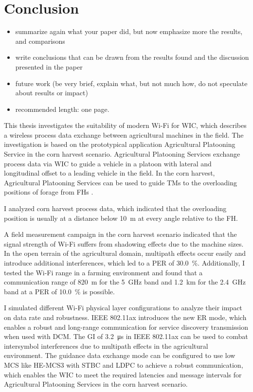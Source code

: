 \chapter{Conclusion}
\acresetall

\begin{itemize}
\item summarize again what your paper did, but now emphasize more the results, and comparisons
\item write conclusions that can be drawn from the results found and the discussion presented in the paper
\item future work (be very brief, explain what, but not much how, do not speculate about results or impact)
\item recommended length: one page.
\end{itemize}
This thesis investigates the suitability of modern Wi-Fi for \ac{WIC}, which describes a wireless process data exchange between agricultural machines in the field.
The investigation is based on the prototypical application Agricultural Platooning Service in the corn harvest scenario.
Agricultural Platooning Services exchange process data via \ac{WIC} to guide a vehicle in a platoon with lateral and longitudinal
offset to a leading vehicle in the field.
In the corn harvest, Agricultural Platooning Services can be used to guide \ac{TM}s to the overloading positions of forage from \ac{FH}s .

I analyzed corn harvest process data, which indicated that the overloading position is usually at a distance below \SI{10}{\metre} at every angle relative to the \ac{FH}.

A field measurement campaign in the corn harvest scenario indicated that the signal strength of Wi-Fi suffers from shadowing effects due to the machine sizes.
In the open terrain of the agricultural domain, multipath effects occur easily and introduce additional interferences, which led to a \ac{PER} of \SI{30.0}{\percent}.
Additionally, I tested the Wi-Fi range in a farming environment and found that a communication range of \SI{820}{\meter}
for the \SI{5}{\giga\hertz} band and \SI{1.2}{\kilo\meter} for the \SI{2.4}{\giga\hertz} band
at a \ac{PER} of \SI{10.0}{\percent} is possible. 

I simulated different Wi-Fi physical layer configurations to analyze their impact on data rate and robustness.
IEEE 802.11ax introduces the new \ac{ER} mode, which enables a robust and long-range communication for service discovery transmission when used with \ac{DCM}.
The \ac{GI} of \SI{3.2}{\micro\second} in IEEE 802.11ax can be used to combat intersymbol interferences due to multipath effects in the agricultural environment.
The guidance data exchange mode can be configured to use low \ac{MCS} like \ac{HE}-\ac{MCS}3 with \ac{STBC} and \ac{LDPC} to achieve a robust communication,
which enables the \ac{WIC} to meet the required latencies and message intervals for Agricultural Platooning Services in the corn harvest scenario.

